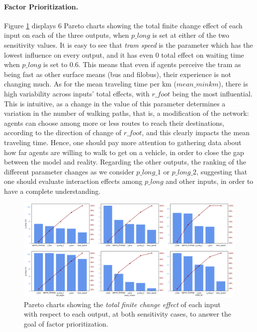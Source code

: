 \paragraph{Factor Prioritization.}
Figure \ref{fig:factor_prior} displays 6 Pareto charts showing the total finite change effect of each input on each of the three outputs, when $p\_long$ is set at either of the two sensitivity values. It is easy to see that \textit{tram speed} is the parameter which has the lowest influence on every output, and it has even 0 total effect on waiting time when $p\_long$ is set to 0.6. This means that even if agents perceive the tram as being fast as other surface means (bus and filobus), their experience is not changing much. As for the mean traveling time per km ($mean\_minkm$), there is high variability across inputs' total effects, with $r\_foot$ being the most influential. This is intuitive, as a change in the value of this parameter determines a variation in the number of walking paths, that is, a modification of the network: agents can choose among more or less routes to reach their destinations, according to the direction of change of $r\_foot$, and this clearly impacts the mean traveling time. Hence, one should pay more attention to gathering data about how far agents are willing to walk to get on a vehicle, in order to close the gap between the model and reality. 
Regarding the other outputs, the ranking of the different parameter changes as we consider $p\_long\_1$ or $p\_long\_2$, suggesting that one should evaluate interaction effects among $p\_long$ and other inputs, in order to have a complete understanding.

\begin{landscape}
\centering
\hspace{10cm}
\begin{figure}[h]
    \centering
    \includegraphics[width = \hsize]{tex/pics/pareto_fp.png}
    \caption{Pareto charts showing the \textit{total finite change effect} of each input with respect to each output, at both sensitivity cases, to answer the goal of factor prioritization.}
    \label{fig:factor_prior}
\end{figure}
\end{landscape}


